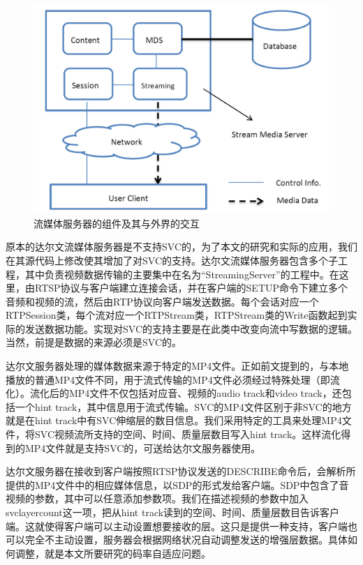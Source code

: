 \begin{figure}[t]
	\centering
	\includegraphics[width = 1.0\linewidth]{clip/11.png}
	\caption{流媒体服务器的组件及其与外界的交互\label{fig:11}}
\end{figure}

原本的达尔文流媒体服务器是不支持SVC的，为了本文的研究和实际的应用，我们在其源代码上修改使其增加了对SVC的支持。达尔文流媒体服务器包含多个子工程，其中负责视频数据传输的主要集中在名为“StreamingServer”的工程中。在这里，由RTSP协议与客户端建立连接会话，并在客户端的SETUP命令下建立多个音频和视频的流，然后由RTP协议向客户端发送数据。每个会话对应一个RTPSession类，每个流对应一个RTPStream类，RTPStream类的Write函数起到实际的发送数据功能。实现对SVC的支持主要是在此类中改变向流中写数据的逻辑。当然，前提是数据的来源必须是SVC的。

达尔文服务器处理的媒体数据来源于特定的MP4文件。正如前文提到的，与本地播放的普通MP4文件不同，用于流式传输的MP4文件必须经过特殊处理（即流化）。流化后的MP4文件不仅包括对应音、视频的audio track和video track，还包括一个hint track，其中信息用于流式传输。SVC的MP4文件区别于非SVC的地方就是在hint track中有SVC伸缩层的数目信息。我们采用特定的工具来处理MP4文件，将SVC视频流所支持的空间、时间、质量层数目写入hint track。这样流化得到的MP4文件就是支持SVC的，可送给达尔文服务器使用。

达尔文服务器在接收到客户端按照RTSP协议发送的DESCRIBE命令后，会解析所提供的MP4文件中的相应媒体信息，以SDP的形式发给客户端。SDP中包含了音视频的参数，其中可以任意添加参数项。我们在描述视频的参数中加入svclayercount这一项，把从hint track读到的空间、时间、质量层数目告诉客户端。这就使得客户端可以主动设置想要接收的层。这只是提供一种支持，客户端也可以完全不主动设置，服务器会根据网络状况自动调整发送的增强层数据。具体如何调整，就是本文所要研究的码率自适应问题。

